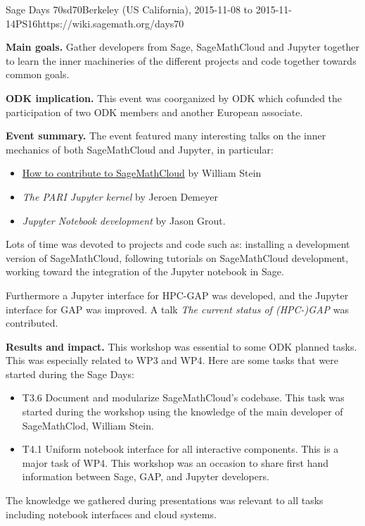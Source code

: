 \begin{event}{Sage Days 70}{sd70}{Berkeley (US California), 2015-11-08 to 2015-11-14}{PS}{16}{https://wiki.sagemath.org/days70}

\textbf{Main goals.} Gather developers from Sage, SageMathCloud and Jupyter together to learn the
inner machineries of the different projects and code together towards common goals.

\textbf{ODK implication.} This event was coorganized by ODK which
cofunded the participation of two ODK members and another European
associate.

\textbf{Event summary.} The event featured many interesting talks on the inner mechanics of
both SageMathCloud and Jupyter, in particular:
\begin{itemize}
\item \href{https://youtu.be/GOuy07Kift4}{How to contribute to SageMathCloud} by William Stein
\item \emph{The PARI Jupyter kernel} by Jeroen Demeyer
\item \emph{Jupyter Notebook development} by Jason Grout.
\end{itemize}
Lots of time was devoted to projects and code such as: installing a development version of SageMathCloud,
following tutorials on SageMathCloud development, working toward the integration of the Jupyter notebook
in Sage.

Furthermore a Jupyter interface for HPC-GAP was developed, and the Jupyter
interface for GAP was improved. A talk \emph{The current status of (HPC-)GAP}
was contributed.

\textbf{Results and impact.} 
This workshop was essential to some ODK planned tasks. This was especially related to WP3 and WP4. Here are some tasks that
were started during the Sage Days:
\begin{itemize}
\item T3.6 Document and modularize SageMathCloud's codebase. This task was started during the workshop using the 
knowledge of the main developer of SageMathClod, William Stein.

\item T4.1 Uniform notebook interface for all interactive components. This is a major task of WP4. This workshop
was an occasion to share first hand information between Sage, GAP, and Jupyter developers.

\end{itemize}
The knowledge we gathered during presentations was relevant to all tasks including notebook interfaces and cloud
systems.

\end{event}
